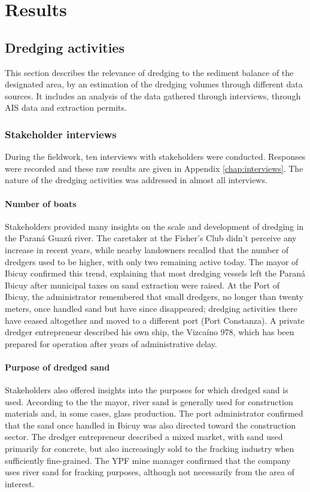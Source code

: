\chapter{Results}
\label{chap:results}
\section{Dredging activities}
This section describes the relevance of dredging to the sediment balance of the designated area, by an estimation of the dredging volumes through different data sources. It includes an analysis of the data gathered through interviews, through AIS data and extraction permits. 

\subsection{Stakeholder interviews}
During the fieldwork, ten interviews with stakeholders were conducted. Responses were recorded and these raw results are given in Appendix \ref{chap:interviews}. The nature of the dredging activities was addressed in almost all interviews. 

\subsubsection{Number of boats}
Stakeholders provided many insights on the scale and development of dredging in the Paraná Guazú river. The caretaker at the Fisher’s Club didn't perceive any increase in recent years, while nearby landowners recalled that the number of dredgers used to be higher, with only two remaining active today. The mayor of Ibicuy confirmed this trend, explaining that most dredging vessels left the Paraná Ibicuy after municipal taxes on sand extraction were raised. At the Port of Ibicuy, the administrator remembered that small dredgers, no longer than twenty meters, once handled sand but have since disappeared; dredging activities there have ceased altogether and moved to a different port (Port Constanza). A private dredger entrepreneur described his own ship, the Vizcaíno 978, which has been prepared for operation after years of administrative delay.

\subsubsection{Purpose of dredged sand}
Stakeholders also offered insights into the purposes for which dredged sand is used. According to the the mayor, river sand is generally used for construction materials and, in some cases, glass production. The port administrator confirmed that the sand once handled in Ibicuy was also directed toward the construction sector. The dredger entrepreneur described a mixed market, with sand used primarily for concrete, but also increasingly sold to the fracking industry when sufficiently fine-grained. The YPF mine manager confirmed that the company uses river sand for fracking purposes, although not necessarily from the area of interest.

